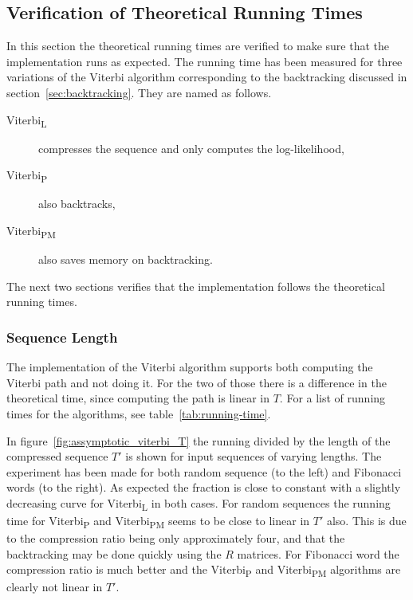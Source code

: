 \subsection{Verification of Theoretical Running Times}
\label{sec:theor-runn-times}

In this section the theoretical running times are verified to make sure that
the implementation runs as expected. The running time has been measured for
three variations of the Viterbi algorithm corresponding to the backtracking
discussed in section~\ref{sec:backtracking}. They are named as follows.
\begin{description}
\item[Viterbi\textsubscript{L}] compresses the sequence and only computes the
  log-likelihood,
\item[Viterbi\textsubscript{P}] also backtracks,
\item[Viterbi\textsubscript{PM}] also saves memory on backtracking.
\end{description}
The next two sections verifies that the implementation follows the theoretical
running times.

\subsubsection{Sequence Length}

The implementation of the Viterbi algorithm supports both computing the Viterbi
path and not doing it. For the two of those there is a difference in the
theoretical time, since computing the path is linear in $T$. For a list of
running times for the algorithms, see table~\ref{tab:running-time}.

In figure~\ref{fig:assymptotic_viterbi_T} the running divided by the length of
the compressed sequence $T'$ is shown for input sequences of varying lengths.
The experiment has been made for both random sequence (to the left) and
Fibonacci words (to the right). As expected the fraction is close to constant
with a slightly decreasing curve for Viterbi\textsubscript{L} in both cases.
For random sequences the running time for Viterbi\textsubscript{P} and
Viterbi\textsubscript{PM} seems to be close to linear in $T'$ also. This is due
to the compression ratio being only approximately four, and that the
backtracking may be done quickly using the $R$ matrices. For Fibonacci word the
compression ratio is much better and the Viterbi\textsubscript{P} and
Viterbi\textsubscript{PM} algorithms are clearly not linear in $T'$.

